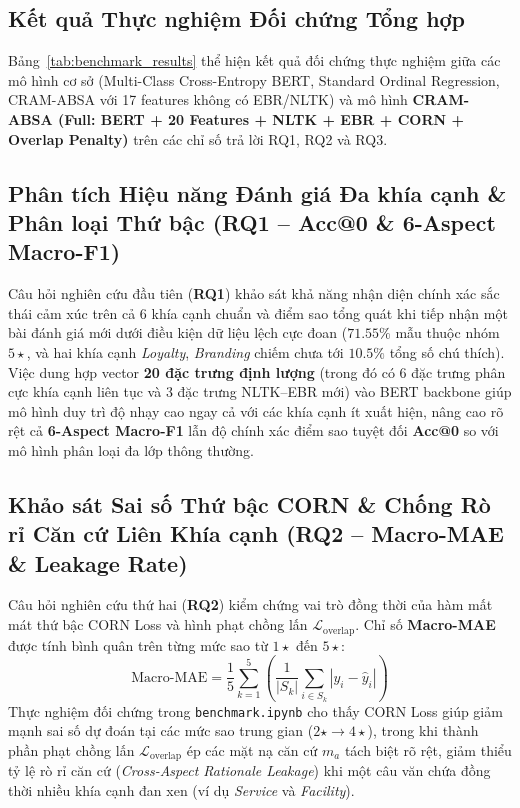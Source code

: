 \documentclass[pdflatex,sn-mathphys-num]{sn-jnl}
\theoremstyle{thmstyleone}
\theoremstyle{thmstyletwo}
\theoremstyle{thmstylethree}
\begin{document}
\subsection{Kết quả Thực nghiệm Đối chứng Tổng hợp}
\label{subsec:empirical_results}

Bảng~\ref{tab:benchmark_results} thể hiện kết quả đối chứng thực nghiệm giữa các mô hình cơ sở (Multi-Class Cross-Entropy BERT, Standard Ordinal Regression, CRAM-ABSA với 17 features không có EBR/NLTK) và mô hình \textbf{CRAM-ABSA (Full: BERT + 20 Features + NLTK + EBR + CORN + Overlap Penalty)} trên các chỉ số trả lời RQ1, RQ2 và RQ3.

\relax 

\subsection{Phân tích Hiệu năng Đánh giá Đa khía cạnh \& Phân loại Thứ bậc (RQ1 -- Acc@0 \& 6-Aspect Macro-F1)}
\label{subsec:analysis_rq1}

Câu hỏi nghiên cứu đầu tiên (\textbf{RQ1}) khảo sát khả năng nhận diện chính xác sắc thái cảm xúc trên cả 6 khía cạnh chuẩn và điểm sao tổng quát khi tiếp nhận một bài đánh giá mới dưới điều kiện dữ liệu lệch cực đoan ($71.55\%$ mẫu thuộc nhóm $5\star$, và hai khía cạnh \textit{Loyalty}, \textit{Branding} chiếm chưa tới $10.5\%$ tổng số chú thích). Việc dung hợp vector \textbf{20 đặc trưng định lượng} (trong đó có 6 đặc trưng phân cực khía cạnh liên tục và 3 đặc trưng NLTK--EBR mới) vào BERT backbone giúp mô hình duy trì độ nhạy cao ngay cả với các khía cạnh ít xuất hiện, nâng cao rõ rệt cả \textbf{6-Aspect Macro-F1} lẫn độ chính xác điểm sao tuyệt đối \textbf{Acc@0} so với mô hình phân loại đa lớp thông thường.

\subsection{Khảo sát Sai số Thứ bậc CORN \& Chống Rò rỉ Căn cứ Liên Khía cạnh (RQ2 -- Macro-MAE \& Leakage Rate)}
\label{subsec:analysis_rq2}

Câu hỏi nghiên cứu thứ hai (\textbf{RQ2}) kiểm chứng vai trò đồng thời của hàm mất mát thứ bậc CORN Loss và hình phạt chồng lấn $\mathcal{L}_{\text{overlap}}$. Chỉ số \textbf{Macro-MAE} được tính bình quân trên từng mức sao từ $1\star$ đến $5\star$:
\begin{equation}
\text{Macro-MAE} = \frac{1}{5} \sum_{k=1}^{5} \left( \frac{1}{|S_k|} \sum_{i \in S_k} |y_i - \hat{y}_i| \right)
\end{equation}
Thực nghiệm đối chứng trong \texttt{benchmark.ipynb} cho thấy CORN Loss giúp giảm mạnh sai số dự đoán tại các mức sao trung gian ($2\star \to 4\star$), trong khi thành phần phạt chồng lấn $\mathcal{L}_{\text{overlap}}$ ép các mặt nạ căn cứ $m_a$ tách biệt rõ rệt, giảm thiểu tỷ lệ rò rỉ căn cứ (\textit{Cross-Aspect Rationale Leakage}) khi một câu văn chứa đồng thời nhiều khía cạnh đan xen (ví dụ \textit{Service} và \textit{Facility}).
\end{document}
